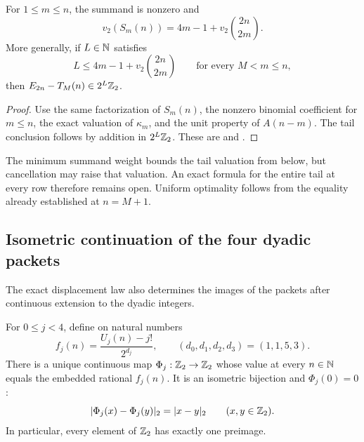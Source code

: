 \begin{proposition}\label{prop:arith-row-weight}
For $1\le m\le n$, the summand is nonzero and
\[
 v_2(S_m(n))=4m-1+v_2\binom{2n}{2m}.
\]
More generally, if $L\in\mathbb N$ satisfies
\[
 L\le4m-1+v_2\binom{2n}{2m}\qquad\text{for every }M<m\le n,
\]
then $E_{2n}-T_M(n)\in2^L\mathbb Z_2$.
\end{proposition}

\begin{proof}
Use the same factorization of $S_m(n)$, the nonzero binomial coefficient
for $m\le n$, the exact valuation of $\kappa_m$, and the unit property
of $A(n-m)$.  The tail conclusion follows by addition in $2^L\mathbb Z_2$.
These are  and
.
\end{proof}

The minimum summand weight bounds the tail valuation from below, but
cancellation may raise that valuation.  An exact formula for the entire
tail at every row therefore remains open.  Uniform optimality follows
from the equality already established at $n=M+1$.

\subsection{Isometric continuation of the four dyadic packets}

The exact displacement law also determines the images of the packets
after continuous extension to the dyadic integers.

\begin{theorem}\label{thm:arith-isometry}
For $0\le j<4$, define on natural numbers
\[
 f_j(n)=\frac{U_j(n)-j!}{2^{d_j}},\qquad (d_0,d_1,d_2,d_3)=(1,1,5,3).
\]
There is a unique continuous map $\Phi_j:\mathbb Z_2\to\mathbb Z_2$ whose value at
every $n\in\mathbb N$ equals the embedded rational $f_j(n)$.
It is an isometric bijection and $\Phi_j(0)=0$:
\[
 |\Phi_j(x)-\Phi_j(y)|_2=|x-y|_2\qquad(x,y\in\mathbb Z_2).
\]
In particular, every element of $\mathbb Z_2$ has exactly one preimage.
\end{theorem}

